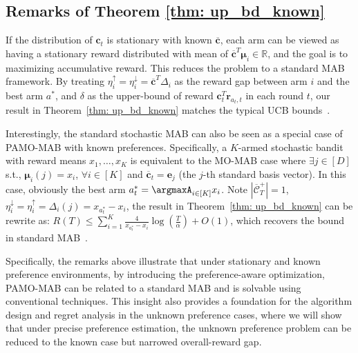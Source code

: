 \subsection{Remarks of Theorem \ref{thm: up_bd_known}}
\vspace{-10pt}
\textcolor[rgb]{0.4, 0.4, 1}{
\begin{remark}
If the distribution of $\boldsymbol{c}_t$ is stationary with known $\boldsymbol{\overline{c}}$, each arm can be viewed as having a stationary reward distributed with mean of $\boldsymbol{\overline{c}}^T \boldsymbol{\mu}_i \in \mathbb{R}$, and the goal is to maximizing accumulative reward. This reduces the problem to a standard MAB framework. By treating $\eta_{i}^{\uparrow} = \eta_{i}^{\downarrow} = \boldsymbol{\overline{c}}^T \Delta_i$ as the reward gap between arm $i$ and the best arm $a^*$, and $\delta$ as the upper-bound of reward $\boldsymbol{c}_t^T \boldsymbol{r}_{a_t,t}$ in each round $t$, our result in Theorem~\ref{thm: up_bd_known} matches the typical UCB bounds~\citep{auer2002finite}. 
\end{remark} 
}
\vspace{-15pt}

\textcolor[rgb]{0.4, 0.4, 1}{
\begin{remark}
Interestingly, the standard stochastic MAB can also be seen as a special case of PAMO-MAB with known preferences. 
Specifically, a $K$-armed stochastic bandit with reward means $x_1, \dots, x_K$ is equivalent to the MO-MAB case where $\exists j \in [D]$ s.t., $\boldsymbol{\mu}_i(j) = x_i$, $\forall i \in [K]$ and $\overline{\boldsymbol{c}}_t = \boldsymbol{e}_j$ (the $j$-th standard basis vector). 
In this case, obviously the best arm $a_t^* = \argmaxA_{i \in [K]} x_i$. 
Note 
$|\mathcal{\overline{C}}^{+}_{T}| \!=\! 1$, 
$\eta_{i}^{\downarrow} \!=\! \eta_{i}^{\uparrow} \!=\! \Delta_i(j) \!=\! x_{a_{t}^*} \!-\! x_{i}$,
the result in Theorem~\ref{thm: up_bd_known} can be rewrite as:
$
\textstyle
R(T) \leq \sum_{i=1}^{K}  \frac{4}{x_{a_{t}^*} - x_{i}} \log{(\frac{T}{\alpha})} + O(1)
$,
which recovers the bound in standard MAB~\citep{auer2002finite}.
\end{remark} 
}

\textcolor[rgb]{0.4, 0.4, 1}{
Specifically, the remarks above illustrate that under stationary and known preference environments, by introducing the preference-aware optimization, PAMO-MAB can be related to a standard MAB and is solvable using conventional techniques.
This insight also provides a foundation for the algorithm design and regret analysis in the unknown preference cases, where we will show that under precise preference estimation, the unknown preference problem can be reduced to the known case but narrowed overall-reward gap.
}